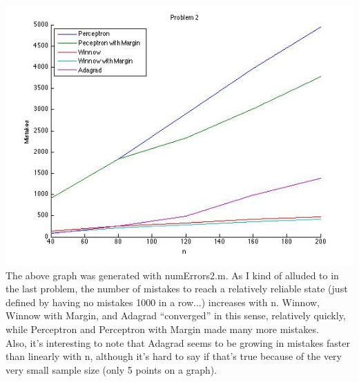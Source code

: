 \begin{enumerate}
\includegraphics[scale=0.5]{HW3_code/problem2}\\
The above graph was generated with numErrors2.m. As I kind of alluded to in the last problem, the number of mistakes to reach a relatively reliable state (just defined by having no mistakes 1000 in a row...) increases with n. Winnow, Winnow with Margin, and Adagrad ``converged'' in this sense, relatively quickly, while Perceptron and Perceptron with Margin made many more mistakes.\\
Also, it's interesting to note that Adagrad seems to be growing in mistakes faster than linearly with n, although it's hard to say if that's true because of the very very small sample size (only 5 points on a graph).








\end{enumerate}
